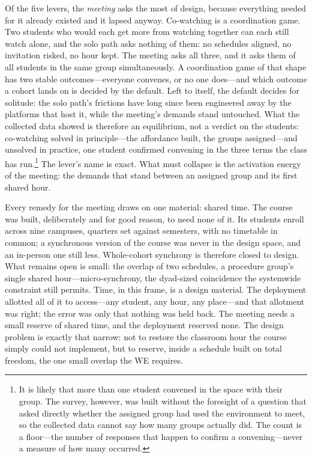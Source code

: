 Of the five levers, the \textit{meeting} asks the most of design,
because everything needed for it already existed and it lapsed anyway.
Co-watching is a coordination game. Two students who would each get
more from watching together can each still watch alone, and the solo
path asks nothing of them: no schedules aligned, no invitation risked,
no hour kept. The meeting asks all three, and it asks them of all
students in the same group simultaneously. A coordination game of that shape has two stable
outcomes---everyone convenes, or no one does---and which outcome a
cohort lands on is decided by the default. Left to itself, the default
decides for solitude: the solo path's frictions have long since been
engineered away by the platforms that host it, while the meeting's
demands stand untouched. What the collected data showed is therefore
an equilibrium, not a verdict on the students: co-watching solved in
principle---the affordance built, the groups assigned---and unsolved
in practice, one student confirmed convening in the three terms the
class has run.\footnote{It is likely that more than one student
convened in the space with their group. The survey, however, was built
without the foresight of a question that asked directly whether the
assigned group had used the environment to meet, so the collected data
cannot say how many groups actually did. The count is a floor---the
number of responses that happen to confirm a convening---never a
measure of how many occurred.} The lever's name
is exact. What must collapse is the activation energy of the meeting:
the demands that stand between an assigned group and its first shared
hour.

Every remedy for the meeting draws on one material: shared time. The
course was built, deliberately and for good reason, to need none of
it. Its students enroll across nine campuses, quarters set against
semesters, with no timetable in common; a synchronous version of the
course was never in the design space, and an in-person one still
less. Whole-cohort
synchrony is therefore closed to design. What remains open is small:
the overlap of two schedules, a procedure group's single shared
hour---micro-synchrony, the dyad-sized coincidence the systemwide
constraint still permits. Time, in this frame, is a design
material. The deployment allotted all of it to access---any student,
any hour, any place---and that allotment was right; the error was only
that nothing was held back. The meeting needs a small reserve of
shared time, and the deployment reserved none. The design problem is
exactly that narrow: not to restore the classroom hour the course
simply could not implement, but to reserve, inside a schedule built on
total freedom, the one small overlap the WE requires.

